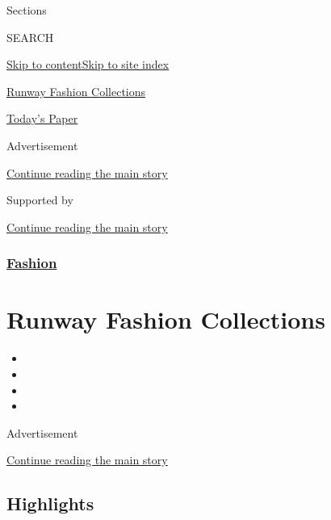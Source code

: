 Sections

SEARCH

\protect\hyperlink{site-content}{Skip to
content}\protect\hyperlink{site-index}{Skip to site index}

\href{https://www.nytimes3xbfgragh.onion/spotlight/fashion-runway-slideshows}{Runway
Fashion Collections}

\href{https://myaccount.nytimes3xbfgragh.onion/auth/login?response_type=cookie\&client_id=vi}{}

\href{https://www.nytimes3xbfgragh.onion/section/todayspaper}{Today's
Paper}

Advertisement

\protect\hyperlink{after-top}{Continue reading the main story}

Supported by

\protect\hyperlink{after-sponsor}{Continue reading the main story}

\hypertarget{fashion}{%
\subsubsection{\texorpdfstring{\href{/section/fashion}{Fashion}}{Fashion}}\label{fashion}}

\hypertarget{runway-fashion-collections}{%
\section{Runway Fashion Collections}\label{runway-fashion-collections}}

\begin{itemize}
\item
\item
\item
\item
\end{itemize}

Advertisement

\protect\hyperlink{after-subheader}{Continue reading the main story}

\hypertarget{highlights}{%
\subsection{Highlights}\label{highlights}}

